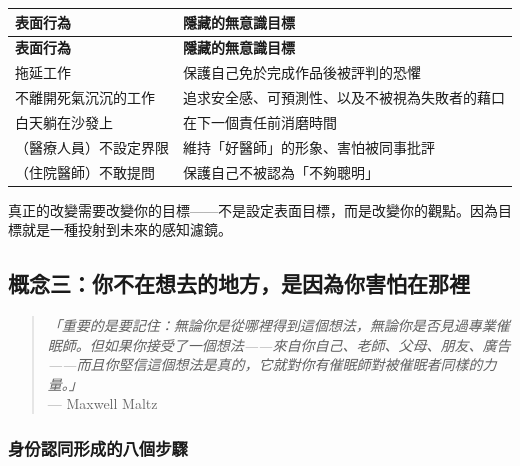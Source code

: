 \documentclass[12pt,a4paper]{article}
\begin{document}
\begin{longtable}{p{5cm}p{9cm}}
\toprule
\textbf{表面行為} & \textbf{隱藏的無意識目標} \\
\midrule
\endfirsthead

\toprule
\textbf{表面行為} & \textbf{隱藏的無意識目標} \\
\midrule
\endhead

\bottomrule
\endfoot

拖延工作 & 保護自己免於完成作品後被評判的恐懼 \\
\midrule
不離開死氣沉沉的工作 & 追求安全感、可預測性、以及不被視為失敗者的藉口 \\
\midrule
白天躺在沙發上 & 在下一個責任前消磨時間 \\
\midrule
（醫療人員）不設定界限 & 維持「好醫師」的形象、害怕被同事批評 \\
\midrule
（住院醫師）不敢提問 & 保護自己不被認為「不夠聰明」 \\
\bottomrule
\end{longtable}

\begin{tcolorbox}[colback=emergency_blue!5!white, colframe=emergency_blue, title=\textbf{關鍵教訓}]
真正的改變需要改變你的目標——不是設定表面目標，而是改變你的觀點。因為目標就是一種投射到未來的感知濾鏡。
\end{tcolorbox}

\subsection{概念三：你不在想去的地方，是因為你害怕在那裡}

\begin{quote}
\textit{「重要的是要記住：無論你是從哪裡得到這個想法，無論你是否見過專業催眠師。但如果你接受了一個想法——來自你自己、老師、父母、朋友、廣告——而且你堅信這個想法是真的，它就對你有催眠師對被催眠者同樣的力量。」}\\
\hfill — Maxwell Maltz
\end{quote}

\subsubsection{身份認同形成的八個步驟}
\end{document}
